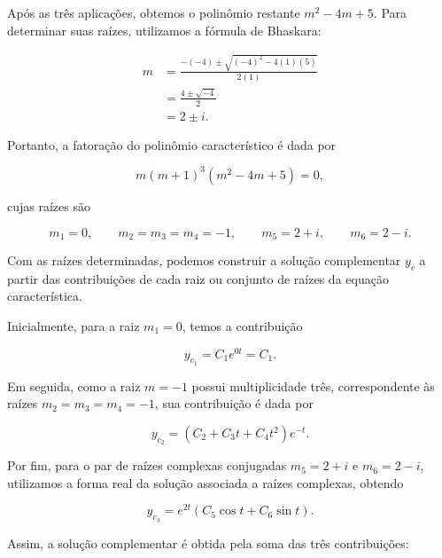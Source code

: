 {  Após as três aplicações, obtemos o polinômio restante
  $m^2-4m+5$. Para determinar suas raízes, utilizamos a fórmula de
  Bhaskara:
  
  \begin{equation*}
  \begin{aligned}
    m
    &= \frac{-(-4)\pm\sqrt{(-4)^2-4(1)(5)}}{2(1)} \\
    &= \frac{4\pm\sqrt{-4}}{2} \\
    &= 2\pm i.
  \end{aligned}
  \end{equation*}
  
  Portanto, a fatoração do polinômio característico é dada por
  
  \begin{equation*}
    m(m+1)^3(m^2-4m+5)=0,
  \end{equation*}
  
  cujas raízes são
  
  \begin{equation}
    m_1=0,\qquad
    m_2=m_3=m_4=-1,\qquad
    m_5=2+i,\qquad
    m_6=2-i.
  \end{equation}
  
  Com as raízes determinadas, podemos construir a solução complementar
  $y_c$ a partir das contribuições de cada raiz ou conjunto de raízes da
  equação característica.
  
  Inicialmente, para a raiz $m_1=0$, temos a contribuição
  
  \begin{equation*}
    y_{c_1}=C_1e^{0t}=C_1.
  \end{equation*}
  
  Em seguida, como a raiz $m=-1$ possui multiplicidade três, correspondente
  às raízes $m_2=m_3=m_4=-1$, sua contribuição é dada por
  
  \begin{equation*}
    y_{c_2}=(C_2+C_3t+C_4t^2)e^{-t}.
  \end{equation*}
  
  Por fim, para o par de raízes complexas conjugadas
  $m_5=2+i$ e $m_6=2-i$, utilizamos a forma real da solução associada
  a raízes complexas, obtendo
  
  \begin{equation*}
    y_{c_3}=e^{2t}\left(C_5\cos t+C_6\sin t\right).
  \end{equation*}
  
  Assim, a solução complementar é obtida pela soma das três contribuições:
  
}

